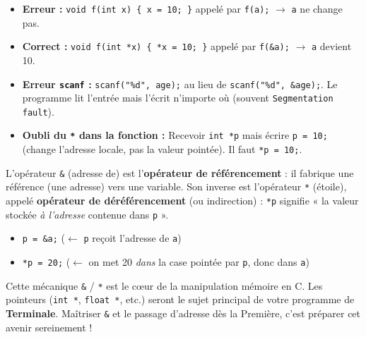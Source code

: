 \documentclass[11pt]{article}
\begin{document}
\begin{attention}
\begin{itemize}
    \item \textbf{Erreur :} \texttt{void f(int x) \{ x = 10; \}} appelé par \texttt{f(a);} $\rightarrow$ \texttt{a} ne change pas.
    \item \textbf{Correct :} \texttt{void f(int *x) \{ *x = 10; \}} appelé par \texttt{f(\&a);} $\rightarrow$ \texttt{a} devient 10.
    \item \textbf{Erreur \texttt{scanf} :} \texttt{scanf("\%d", age);} au lieu de \texttt{scanf("\%d", \&age);}. Le programme lit l'entrée mais l'écrit n'importe où (souvent \texttt{Segmentation fault}).
    \item \textbf{Oubli du \texttt{*} dans la fonction :} Recevoir \texttt{int *p} mais écrire \texttt{p = 10;} (change l'adresse locale, pas la valeur pointée). Il faut \texttt{*p = 10;}.
\end{itemize}
\end{attention}

\begin{savaistu}
L'opérateur \texttt{\&} (adresse de) est l'\textbf{opérateur de référencement} : il fabrique une référence (une adresse) vers une variable.
Son inverse est l'opérateur \texttt{*} (étoile), appelé \textbf{opérateur de déréférencement} (ou indirection) : \texttt{*p} signifie « la valeur stockée \emph{à l'adresse} contenue dans \texttt{p} ».
\begin{itemize}
    \item \texttt{p = \&a;} \quad ($\leftarrow$ \texttt{p} reçoit l'adresse de \texttt{a})
    \item \texttt{*p = 20;} \quad ($\leftarrow$ on met 20 \emph{dans} la case pointée par \texttt{p}, donc dans \texttt{a})
\end{itemize}
Cette mécanique \texttt{\&} / \texttt{*} est le cœur de la manipulation mémoire en C. Les pointeurs (\texttt{int *}, \texttt{float *}, etc.) seront le sujet principal de votre programme de \textbf{Terminale}. Maîtriser \texttt{\&} et le passage d'adresse dès la Première, c'est préparer cet avenir sereinement !
\end{savaistu}
\end{document}
